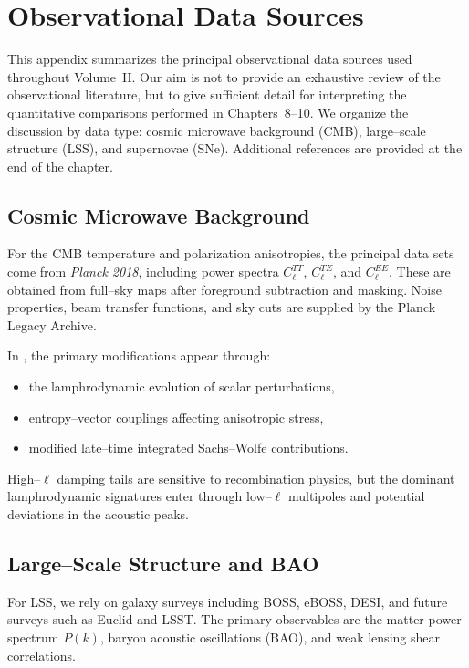 
\chapter{Observational Data Sources}
\label{app:obs-data}

This appendix summarizes the principal observational data sources used
throughout Volume~II.  Our aim is not to provide an exhaustive review
of the observational literature, but to give sufficient detail for
interpreting the quantitative comparisons performed in
Chapters~8--10.  We organize the discussion by data type: cosmic
microwave background (CMB), large--scale structure (LSS), and
supernovae (SNe).  Additional references are provided at the end of
the chapter.

\section{Cosmic Microwave Background}

For the CMB temperature and polarization anisotropies, the principal
data sets come from \emph{Planck 2018}, including power spectra
$C_\ell^{TT}$, $C_\ell^{TE}$, and $C_\ell^{EE}$.  These are obtained
from full--sky maps after foreground subtraction and masking.  Noise
properties, beam transfer functions, and sky cuts are supplied by the
Planck Legacy Archive.

In \rsvpabbr{}, the primary modifications appear through:
\begin{itemize}
  \item the lamphrodynamic evolution of scalar perturbations,
  \item entropy--vector couplings affecting anisotropic stress,
  \item modified late--time integrated Sachs--Wolfe contributions.
\end{itemize}
High--$\ell$ damping tails are sensitive to recombination physics, but
the dominant lamphrodynamic signatures enter through low--$\ell$
multipoles and potential deviations in the acoustic peaks.

\section{Large--Scale Structure and BAO}

For LSS, we rely on galaxy surveys including BOSS, eBOSS, DESI, and
future surveys such as Euclid and LSST.  The primary observables are
the matter power spectrum $P(k)$, baryon acoustic oscillations (BAO),
and weak lensing shear correlations.  

